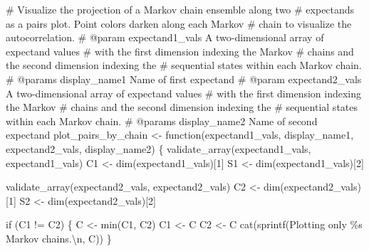 \documentclass[
  letterpaper,
  DIV=11,
  numbers=noendperiod]{scrartcl}
\newenvironment{Shaded}{\begin{snugshade}}{\end{snugshade}}
\newcommand{\BuiltInTok}[1]{\textcolor[rgb]{0.00,0.23,0.31}{#1}}
\newcommand{\CharTok}[1]{\textcolor[rgb]{0.13,0.47,0.30}{#1}}
\newcommand{\CommentTok}[1]{\textcolor[rgb]{0.37,0.37,0.37}{#1}}
\newcommand{\ControlFlowTok}[1]{\textcolor[rgb]{0.00,0.23,0.31}{#1}}
\newcommand{\DecValTok}[1]{\textcolor[rgb]{0.68,0.00,0.00}{#1}}
\newcommand{\NormalTok}[1]{\textcolor[rgb]{0.00,0.23,0.31}{#1}}
\newcommand{\OperatorTok}[1]{\textcolor[rgb]{0.37,0.37,0.37}{#1}}
\newcommand{\SpecialCharTok}[1]{\textcolor[rgb]{0.37,0.37,0.37}{#1}}
\newcommand{\StringTok}[1]{\textcolor[rgb]{0.13,0.47,0.30}{#1}}
\begin{document}
\begin{Shaded}
\begin{Highlighting}[]
\CommentTok{\# Visualize the projection of a Markov chain ensemble along two }
\CommentTok{\# expectands as a pairs plot.  Point colors darken along each Markov }
\CommentTok{\# chain to visualize the autocorrelation.}
\CommentTok{\# @param expectand1\_vals A two{-}dimensional array of expectand values}
\CommentTok{\#                        with the first dimension indexing the Markov}
\CommentTok{\#                        chains and the second dimension indexing the}
\CommentTok{\#                        sequential states within each Markov chain.}
\CommentTok{\# @params display\_name1 Name of first expectand}
\CommentTok{\# @param expectand2\_vals A two{-}dimensional array of expectand values}
\CommentTok{\#                        with the first dimension indexing the Markov}
\CommentTok{\#                        chains and the second dimension indexing the}
\CommentTok{\#                        sequential states within each Markov chain.}
\CommentTok{\# @params display\_name2 Name of second expectand}
\NormalTok{plot\_pairs\_by\_chain }\OperatorTok{\textless{}{-}}\NormalTok{ function(expectand1\_vals, display\_name1,}
\NormalTok{                                expectand2\_vals, display\_name2) \{}
\NormalTok{  validate\_array(expectand1\_vals, }\StringTok{\textquotesingle{}expectand1\_vals\textquotesingle{}}\NormalTok{)}
\NormalTok{  C1 }\OperatorTok{\textless{}{-}}\NormalTok{ dim(expectand1\_vals)[}\DecValTok{1}\NormalTok{]}
\NormalTok{  S1 }\OperatorTok{\textless{}{-}}\NormalTok{ dim(expectand1\_vals)[}\DecValTok{2}\NormalTok{]}

\NormalTok{  validate\_array(expectand2\_vals, }\StringTok{\textquotesingle{}expectand2\_vals\textquotesingle{}}\NormalTok{)}
\NormalTok{  C2 }\OperatorTok{\textless{}{-}}\NormalTok{ dim(expectand2\_vals)[}\DecValTok{1}\NormalTok{]}
\NormalTok{  S2 }\OperatorTok{\textless{}{-}}\NormalTok{ dim(expectand2\_vals)[}\DecValTok{2}\NormalTok{]}
  
  \ControlFlowTok{if}\NormalTok{ (C1 }\OperatorTok{!=}\NormalTok{ C2) \{}
\NormalTok{    C }\OperatorTok{\textless{}{-}} \BuiltInTok{min}\NormalTok{(C1, C2)}
\NormalTok{    C1 }\OperatorTok{\textless{}{-}}\NormalTok{ C}
\NormalTok{    C2 }\OperatorTok{\textless{}{-}}\NormalTok{ C}
\NormalTok{    cat(sprintf(}\StringTok{\textquotesingle{}Plotting only }\SpecialCharTok{\%s}\StringTok{ Markov chains.}\CharTok{\textbackslash{}n}\StringTok{\textquotesingle{}}\NormalTok{, C))}
\NormalTok{  \}}


\end{Highlighting}
\end{Shaded}
\end{document}
